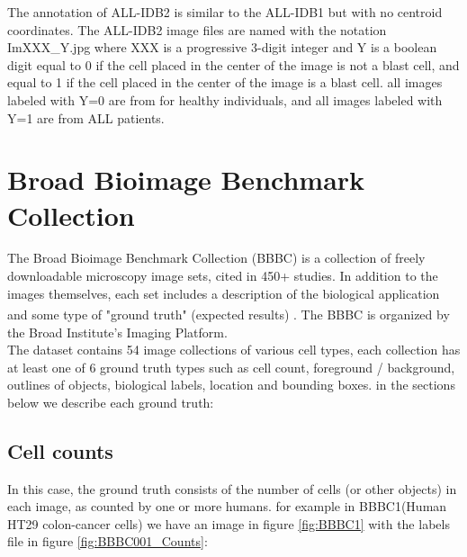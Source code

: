 The annotation of ALL-IDB2 is similar to the ALL-IDB1 but with no centroid coordinates. The ALL-IDB2 image files are named with the notation ImXXX\_Y.jpg where XXX is a progressive 3-digit integer and Y is a boolean digit equal to 0 if the cell placed in the center of the image is not a blast cell, and equal to 1 if the cell placed in the center of the image is a blast cell. all images labeled with Y=0 are from for healthy individuals, and all images labeled with Y=1 are from ALL patients. 

\newpage 

\section{Broad Bioimage Benchmark Collection}

The Broad Bioimage Benchmark Collection (BBBC) is a collection of freely downloadable microscopy image sets, cited in 450+ studies. In addition to the images themselves, each set includes a description of the biological application and some type of "ground truth" (expected results) \textsuperscript{\cite{ljosa2012annotated}}. The BBBC is organized by the Broad Institute's Imaging Platform.\\

The dataset contains 54 image collections of various cell types, each collection has at least one of 6 ground truth types such as cell count, foreground / background, outlines of objects, biological labels, location and bounding boxes. in the sections below we describe each ground truth:
\subsection{Cell counts}
In this case, the ground truth consists of the number of cells (or other objects) in each image, as counted by one or more humans. for example in BBBC1(Human HT29 colon-cancer cells) we have an image in figure \ref{fig:BBBC1} with the labels file in figure \ref{fig:BBBC001_Counts}:

